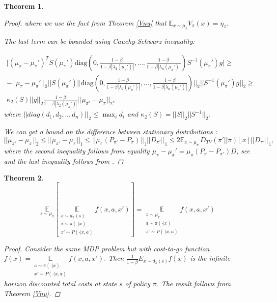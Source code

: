 \documentclass[11pt]{article}
\newcommand{\E}{\mathbb{E}}
\newtheorem{theorem}{Theorem}
\theoremstyle{definition}
\numberwithin{equation}{section}
\begin{document}
\begin{theorem}
\begin{proof}
where we use the fact from Theorem \ref{Vnu} that $\E_{x\sim\mu_\pi} V_{\pi}(x) = \eta_\pi$.

The last term can be bounded using Cauchy-Schwarz inequality:


\begin{align}
\Big|(\mu_\pi - \mu_\pi')^T S(\mu_\pi') \text{diag}(0, \frac{1-\beta}{ 1 - \beta|\lambda_2(\mu_\pi')|},  ..., \frac{1-\beta}{ 1 - \beta|\lambda_n(\mu_\pi')|})S^{-1}(\mu_\pi')g\Big|\geq&\\
- || \mu_\pi - \mu_\pi'||_2||S(\mu_\pi')\Big|\Big|\text{diag}(0, \frac{1-\beta}{ 1 - \beta|\lambda_2(\mu_\pi')|},  ..., \frac{1-\beta}{ 1 - \beta|\lambda_n(\mu_\pi')|})\Big|\Big|_2||S^{-1}(\mu_\pi')g||_2\geq&\\
\kappa_2(S)||g||_2 \frac{1-\beta}{ 1 - \beta|\lambda_2(\mu_\pi')|} ||\mu_{\pi'} - \mu_\pi||_2,
\end{align}
where $||diag(d_1, d_2, .., d_n)||_2\leq \max_i d_i$ and $\kappa_2(S) = ||S||_2||S^{-1}||_2$.


We can get a bound on the difference between stationary distributions :
\begin{equation}
|| \mu_{\pi'} - \mu_\pi||_2\leq  || \mu_{\pi'} - \mu_\pi||_1 \leq ||\mu_\pi(P_{\pi'} - P_{\pi})||_1||D_{\pi'}||_1\leq 2\E_{x\sim \mu_{\pi'}} D_{TV}(\pi'||\pi)[x]||D_{\pi'}||_1,
\end{equation}
where the second inequality follows from equality $\mu_\pi - \mu_\pi' = \mu_\pi(P_\pi - P_{\pi'})D$, see \cite[Section 2]{Liu2012}   and the last inequality follows from \cite[Lemma 3]{Achiam2017}.
\end{proof}

\end{theorem}




\begin{theorem}\label{thm:distr}
\begin{equation}
\underset{s\sim\mu_\pi}{\E}\left[\underset{\substack{x\sim d_\pi(s)\\a\sim\pi(\cdot|x)  \\  x'\sim P(\cdot|x, a)}  }{\E}  f(x, a, x') \right]= \underset{\substack{x\sim \mu_\pi\\a\sim\pi(\cdot|x)  \\  x'\sim P(\cdot|x, a)}  }{\E} f(x,a , x')
\end{equation}

\begin{proof}

Consider the same MDP problem but with cost-to-go function $f(x) = \underset{\substack{a\sim\pi(\cdot|x)  \\  x'\sim P(\cdot|x, a)}  }{\E}  f(x, a, x') $. Then $\frac{1}{1-\beta}E_{x\sim d_\pi(s)} f(x) $ is the infinite horizon discounted total costs at state $s$ of policy $\pi$. The result follows from Theorem \ref{Vnu}.

\end{proof}
\end{theorem}
\end{document}
